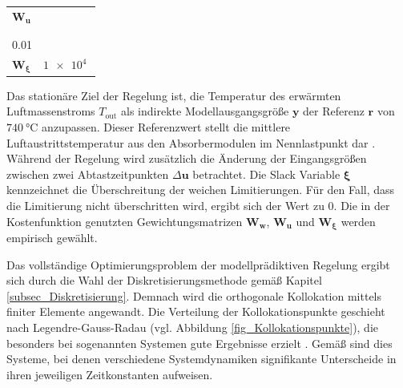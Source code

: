 \begin{table}[ht!]
\begin{tabular}{>{\centering\arraybackslash}m{}>{\centering\arraybackslash}m{}}
        $\boldsymbol{W_u}$           & \[\arraycolsep=0pt\def\arraystretch{1.2} \left(\begin{array}{c} 10 \\ 10 \\ 10 \\ \SI{0.01}{} \end{array}\right) \]                                                                 \\[-0.5cm]
        $\boldsymbol{W_{\xi}}$       & $\SI{1e4}{}$                                                                                                                                                                        \\
        \toprule
    \end{tabular}
    \label{tab_Kostenfunktion}
\end{table}
\endgroup


Das stationäre Ziel der Regelung ist, die Temperatur des erwärmten Luftmassenstroms $T_{\mathrm{out}}$ als indirekte Modellausgangsgröße $\boldsymbol{y}$ der Referenz $\boldsymbol{r}$ von $\SI{740}{\celsius}$ anzupassen.
Dieser Referenzwert stellt die mittlere Luftaustrittstemperatur aus den Absorbermodulen im Nennlastpunkt dar \cite[\S.29]{HandbuchJülich}.
Während der Regelung wird zusätzlich die Änderung der Eingangsgrößen zwischen zwei Abtastzeitpunkten $\Delta \boldsymbol{u}$ betrachtet.
Die Slack Variable $\boldsymbol{\xi}$ kennzeichnet die Überschreitung der weichen Limitierungen.
Für den Fall, dass die Limitierung nicht überschritten wird, ergibt sich der Wert zu 0.
Die in der Kostenfunktion genutzten Gewichtungsmatrizen $\boldsymbol{W_w}$, $\boldsymbol{W_u}$ und $\boldsymbol{W_{\xi}}$ werden empirisch gewählt.


Das vollständige Optimierungsproblem der modellprädiktiven Regelung ergibt sich durch die Wahl der Diskretisierungsmethode gemäß Kapitel \ref{subsec_Diskretisierung}.
Demnach wird die orthogonale Kollokation mittels finiter Elemente angewandt.
Die Verteilung der Kollokationspunkte geschieht nach Legendre-Gauss-Radau (vgl. Abbildung \ref{fig_Kollokationspunkte}), die besonders bei sogenannten  Systemen gute Ergebnisse erzielt \cite[S.178]{Diehl2}.
Gemäß \cite[S.171ff]{Diehl2} sind dies Systeme, bei denen verschiedene Systemdynamiken signifikante Unterscheide in ihren jeweiligen Zeitkonstanten aufweisen.

